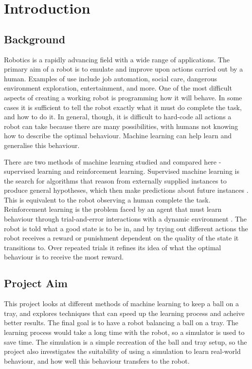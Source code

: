 \documentclass[12pt,a4paper]{article}
\begin{document}
\section{Introduction}
\subsection{Background}
Robotics is a rapidly advancing field with a wide range of applications. The primary aim of a robot is to emulate and improve upon actions carried out by a human. Examples of use include job automation, social care, dangerous environment exploration, entertainment, and more. One of the most difficult aspects of creating a working robot is programming how it will behave. In some cases it is sufficient to tell the robot exactly what it must do complete the task, and how to do it. In general, though, it is difficult to hard-code all actions a robot can take because there are many possibilities, with humans not knowing how to describe the optimal behaviour. Machine learning can help learn and generalise this behaviour.

There are two methods of machine learning studied and compared here - supervised learning and reinforcement learning. Supervised machine learning is the search for algorithms that reason from externally supplied instances to produce general hypotheses, which then make predictions about future instances \cite{sl}. This is equivalent to the robot observing a human complete the task. Reinforcement learning is the problem faced by an agent that must learn behaviour through trial-and-error interactions with a dynamic environment \cite{rl_survey}. The robot is told what a good state is to be in, and by trying out different actions the robot receives a reward or punishment dependent on the quality of the state it transitions to. Over repeated trials it refines its idea of what the optimal behaviour is to receive the most reward.

\subsection{Project Aim}
This project looks at different methods of machine learning to keep a ball on a tray, and explores techniques that can speed up the learning process and acheive better results. The final goal is to have a robot balancing a ball on a tray. The learning process would take a long time with the robot, so a simulator is used to save time. The simulation is a simple recreation of the ball and tray setup, so the project also investigates the suitability of using a simulation to learn real-world behaviour, and how well this behaviour transfers to the robot. 
\end{document}

